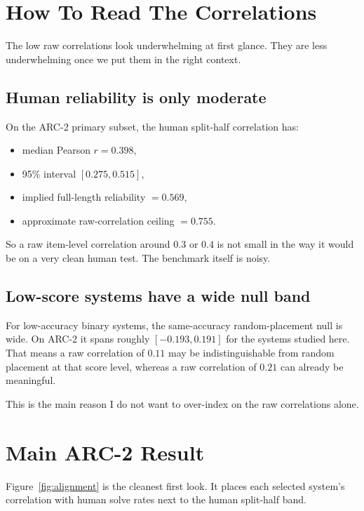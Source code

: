 \documentclass[11pt,letterpaper]{article}
\begin{document}
\section{How To Read The Correlations}

The low raw correlations look underwhelming at first glance. They are less underwhelming once we put them in the right context.

\subsection{Human reliability is only moderate}

On the ARC-2 primary subset, the human split-half correlation has:

\begin{itemize}
    \item median Pearson $r = 0.398$,
    \item 95\% interval $[0.275, 0.515]$,
    \item implied full-length reliability $= 0.569$,
    \item approximate raw-correlation ceiling $= 0.755$.
\end{itemize}

So a raw item-level correlation around $0.3$ or $0.4$ is not small in the way it would be on a very clean human test. The benchmark itself is noisy.

\subsection{Low-score systems have a wide null band}

For low-accuracy binary systems, the same-accuracy random-placement null is wide. On ARC-2 it spans roughly $[-0.193, 0.191]$ for the systems studied here. That means a raw correlation of $0.11$ may be indistinguishable from random placement at that score level, whereas a raw correlation of $0.21$ can already be meaningful.

This is the main reason I do not want to over-index on the raw correlations alone.

\section{Main ARC-2 Result}

Figure~\ref{fig:alignment} is the cleanest first look. It places each selected system's correlation with human solve rates next to the human split-half band.
\end{document}

